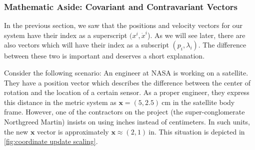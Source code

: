  \subsubsection{Mathematic Aside: Covariant and Contravariant Vectors}
In the previous section, we saw that the positions and velocity vectors for our system have their index as a superscript $(x^i,\dot{x}^i$). As we will see later, there are also vectors which will have their index as a subscript $(p_i,\lambda_i)$. The difference between these two is important and deserves a short explanation.

Consider the following scenario: An engineer at NASA is working on a satellite. They have a position vector which describes the difference between the center of rotation and the location of a certain sensor. As a proper engineer, they express this distance in the metric system as $\bm{x}=(5,2.5) \ \text{cm}$ in the satellite body frame. However, one of the contractors on the project (the super-conglomerate Northgreed Martin) insists on using inches instead of centimeters. In such units, the new $\bm{x}$ vector is approximately $\bm{x}\approx(2,1) \ \text{in}$. This situation is depicted in \autoref{fig:coordinate update scaling}.
